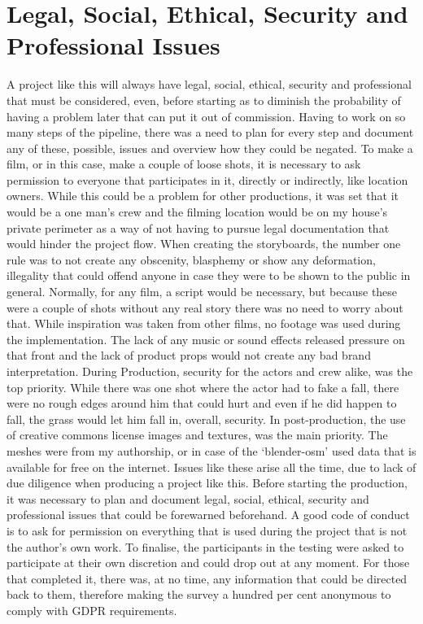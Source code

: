 \section{Legal, Social, Ethical, Security and Professional Issues}
A project like this will always have legal, social, ethical, security and professional that must be considered, even, before starting as to diminish the probability of having a problem later that can put it out of commission. Having to work on so many steps of the pipeline, there was a need to plan for every step and document any of these, possible, issues and overview how they could be negated. To make a film, or in this case, make a couple of loose shots, it is necessary to ask permission to everyone that participates in it, directly or indirectly, like location owners.
While this could be a problem for other productions, it was set that it would be a one man’s crew and the filming location would be on my house’s private perimeter as a way of not having to pursue legal documentation that would hinder the project flow. When creating the storyboards, the number one rule was to not create any obscenity, blasphemy or show any deformation, illegality that could offend anyone in case they were to be shown to the public in general. Normally, for any film, a script would be necessary, but because these were a couple of shots without any real story there was no need to worry about that. While inspiration was taken from other films, no footage was used during the implementation. The lack of any music or sound effects released pressure on that front and the lack of product props would not create any bad brand interpretation.
During Production, security for the actors and crew alike, was the top priority. While there was one shot where the actor had to fake a fall, there were no rough edges around him that could hurt and even if he did happen to fall, the grass would let him fall in, overall, security.
In post-production, the use of creative commons license images and textures, was the main priority. The meshes were from my authorship, or in case of the ‘blender-osm’ used data that is available for free on the internet.
Issues like these arise all the time, due to lack of due diligence when producing a project like this. Before starting the production, it was necessary to plan and document legal, social, ethical, security and professional issues that could be forewarned beforehand. A good code of conduct is to ask for permission on everything that is used during the project that is not the author’s own work.
To finalise, the participants in the testing were asked to participate at their own discretion and could drop out at any moment. For those that completed it, there was, at no time, any information that could be directed back to them, therefore making the survey a hundred per cent anonymous to comply with GDPR requirements.
